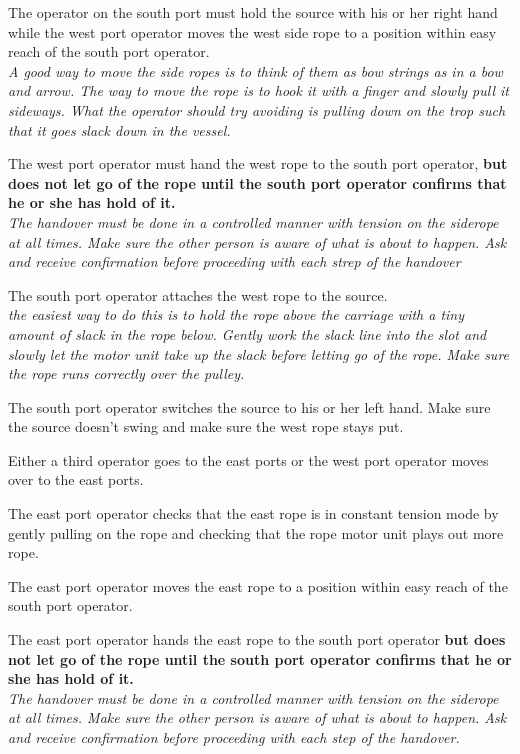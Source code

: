 \documentclass[11pt]{article}
\begin{document}
\begin{enumarate}
\item \CheckBox[name=aesr6]{} The operator on the south port must hold the source with his or her right hand while the west port operator moves the west side rope to a position within easy reach of the south port operator.\\ {\it A good way to move the side ropes is to think of them as bow strings as in a bow and arrow. The way to move the rope is to hook it with a finger and slowly pull it sideways. What the operator should try avoiding is pulling down on the trop such that it goes slack down in the vessel.}
\item \CheckBox[name=aesr7]{} The west port operator must hand the west rope to the south port operator, {\bf but does not let go of the rope until the south port operator confirms that he or she has hold of it.}\\ {\it The handover must be done in a controlled manner with tension on the siderope at all times. Make sure the other person is aware of what is about to happen. Ask and receive confirmation before proceeding with each strep of the handover}
\item \CheckBox[name=aesr8]{} The south port operator attaches the west rope to the source. \\ {\it the easiest way to do this is to hold the rope above the carriage with a tiny amount of slack in the rope below. Gently work the slack line into the slot and slowly let the motor unit take up the slack before letting go of the rope. Make sure the rope runs correctly over the pulley.}
\item \CheckBox[name=aesr9]{} The south port operator switches the source to his or her left hand. Make sure the source doesn't swing and make sure the west rope stays put.
\item \CheckBox[name=aesr10]{} Either a third operator goes to the east ports or the west port operator moves over to the east ports.
\item \CheckBox[name=aesr11]{} The east port operator checks that the east rope is in constant tension mode by gently pulling on the rope and checking that the rope motor unit plays out more rope.
\item \CheckBox[name=aesr12]{} The east port operator moves the east rope to a position within easy reach of the south port operator.
\item \CheckBox[name=aesr13]{} The east port operator hands the east rope to the south port operator {\bf but does not let go of the rope until the south port operator confirms that he or she has hold of it.} \\ {\it The handover must be done in a controlled manner with tension on the siderope at all times. Make sure the other person is aware of what is about to happen. Ask and receive confirmation before proceeding with each step of the handover.}

\end{enumarate}
\end{document}
